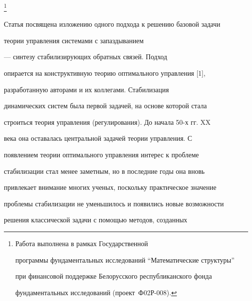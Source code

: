 \thanks{Работа выполнена в рамках Государственной


программы фундаментальных исследований ``Математические структуры''


при финансовой поддержке Белорусского республиканского фонда


фундаментальных исследований (проект \No\,Ф02Р-008).}





\date{}




\pagestyle{plain} %







\maketitle


\label{begin}











Статья посвящена изложению одного подхода к решению базовой задачи


теории управления системами с запаздыванием


--- синтезу стабилизирующих обратных связей. Подход


опирается на конструктивную теорию оптимального управления [1],


разработанную авторами и их коллегами. Стабилизация


динамических систем была первой задачей, на основе которой стала


строиться теория управления (регулирования). До начала 50-х гг. XX


века она оставалась центральной задачей теории управления. С


появлением теории оптимального управления интерес к проблеме


стабилизации стал менее заметным, но в последние годы она вновь


привлекает внимание многих ученых, поскольку практическое значение


проблемы стабилизации не уменьшилось и появились новые возможности


решения классической задачи с помощью методов, созданных


